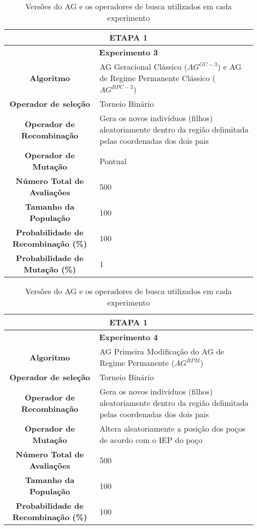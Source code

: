  \begin{table}[H]
\centering
\caption{Versões do AG e os operadores de busca utilizados em cada experimento}

 \begin{tabular}{|c|p{9cm}|}
\hline
 \multicolumn{2}{|c|}{ETAPA 1} \\ \hline
 \multicolumn{2}{|c|}{\textbf{Experimento 3}} \\ \hline
\textbf{Algoritmo} & AG Geracional Clássico ($AG^{GC-3}$) e AG de Regime Permanente Clássico ($AG^{RPC-3}$) \\ \hline
 \textbf{Operador de seleção} & Torneio Binário \\ \hline
 \textbf{Operador de Recombinação} & Gera os novos indivíduos (filhos) aleatoriamente dentro da região delimitada pelas coordenadas dos dois pais \\  \hline
 \textbf{Operador de Mutação} & Pontual \\ \hline
 \textbf{Número Total de Avaliações} & 500 \\ \hline
 \textbf{Tamanho da População} & 100 \\ \hline
 \textbf{Probabilidade de Recombinação (\%)} & 100 \\ \hline
 \textbf{Probabilidade de Mutação (\%)} & 1 \\ \hline 
  
\end{tabular}
\end{table}
 
 \begin{table}[H]
\centering
\caption{Versões do AG e os operadores de busca utilizados em cada experimento}

\begin{tabular}{|c|p{9cm}|}
 \hline
  \multicolumn{2}{|c|}{ETAPA 1} \\ \hline
  \multicolumn{2}{|c|}{\textbf{Experimento 4}} \\ \hline
\textbf{Algoritmo} & AG Primeira Modificação do AG de Regime Permanente ($AG^{RPM}$) \\ \hline
 \textbf{Operador de seleção} & Torneio Binário \\ \hline
 \textbf{Operador de Recombinação} & Gera os novos indivíduos (filhos) aleatoriamente dentro da região delimitada pelas coordenadas dos dois pais \\  \hline
 \textbf{Operador de Mutação} & Altera aleatoriamente a posição dos poços de acordo com o IEP do poço \\ \hline
 \textbf{Número Total de Avaliações} & 500 \\ \hline
 \textbf{Tamanho da População} & 100 \\ \hline
 \textbf{Probabilidade de Recombinação (\%)} & 100 \\ \hline
 
 
 
\end{tabular}
\end{table} 
 
